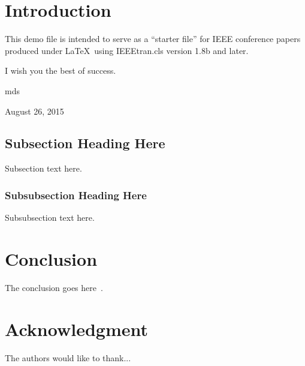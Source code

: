 \documentclass[conference]{IEEEtran}
\begin{document}
\IEEEpeerreviewmaketitle


\section{Introduction}
This demo file is intended to serve as a ``starter file''
for IEEE conference papers produced under \LaTeX\ using
IEEEtran.cls version 1.8b and later.

I wish you the best of success.

\hfill mds

\hfill August 26, 2015

\subsection{Subsection Heading Here}
Subsection text here.


\subsubsection{Subsubsection Heading Here}
Subsubsection text here.


\section{Conclusion}
The conclusion goes here~\cite{test-reference}.


\section*{Acknowledgment}

The authors would like to thank...





\end{document}
